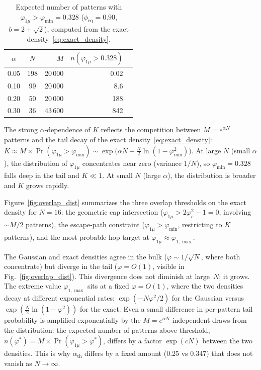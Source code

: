 \documentclass[11pt]{article}
\begin{document}
\begin{table}[h]
\centering
\caption{Expected number of patterns with $\varphi_{1\mu} > \varphi_{\min} = 0.328$ ($\phi_{\mathrm{eq}} = 0.90$, $b = 2+\sqrt{2}$), computed from the exact density~\eqref{eq:exact_density}.}
\label{tab:n_overlap}
\begin{tabular}{ccrrr}
\toprule
$\alpha$ & $N$ & $M$ & $n(\varphi_{1\mu} > 0.328)$ \\
\midrule
0.05 & 198 & 20\,000 & $0.02$ \\
0.10 &  99 & 20\,000 & 8.6 \\
0.20 &  50 & 20\,000 & 188 \\
0.30 &  36 & 43\,600 & 842 \\
\bottomrule
\end{tabular}
\end{table}

The strong $\alpha$-dependence of $K$ reflects the competition between $M = e^{\alpha N}$ patterns and the tail decay of the exact density~\eqref{eq:exact_density}: $K \approx M \times \Pr(\varphi_{1\mu} > \varphi_{\min}) \sim \exp\!\big(\alpha N + \tfrac{N}{2}\ln(1-\varphi_{\min}^2)\big)$.  At large $N$ (small $\alpha$), the distribution of $\varphi_{1\mu}$ concentrates near zero (variance $1/N$), so $\varphi_{\min} = 0.328$ falls deep in the tail and $K \ll 1$.  At small $N$ (large $\alpha$), the distribution is broader and $K$ grows rapidly.

Figure~\ref{fig:overlap_dist} summarizes the three overlap thresholds on the exact density for $N = 16$: the geometric cap intersection ($\varphi_{1\mu} > 2\varphi_c^2 - 1 = 0$, involving $\sim M/2$ patterns), the escape-path constraint ($\varphi_{1\mu} > \varphi_{\min}$, restricting to $K$ patterns), and the most probable hop target at $\varphi_{1\mu} \approx \varphi_{1,\max}$.

The Gaussian and exact densities agree in the bulk ($\varphi \sim 1/\!\sqrt{N}$, where both concentrate) but diverge in the tail ($\varphi = O(1)$, visible in Fig.~\ref{fig:overlap_dist}).  This divergence does not diminish at large~$N$; it grows.  The extreme value $\varphi_{1,\max}$ sits at a fixed $\varphi = O(1)$, where the two densities decay at different exponential rates: $\exp(-N\varphi^2/2)$ for the Gaussian versus $\exp(\tfrac{N}{2}\ln(1-\varphi^2))$ for the exact.  Even a small difference in per-pattern tail probability is amplified exponentially by the $M = e^{\alpha N}$ independent draws from the distribution: the expected number of patterns above threshold, $n(\varphi^*) = M \times \Pr(\varphi_{1\mu} > \varphi^*)$, differs by a factor $\exp(cN)$ between the two densities.  This is why $\alpha_{\mathrm{th}}$ differs by a fixed amount (0.25 vs 0.347) that does not vanish as $N \to \infty$.
\end{document}
